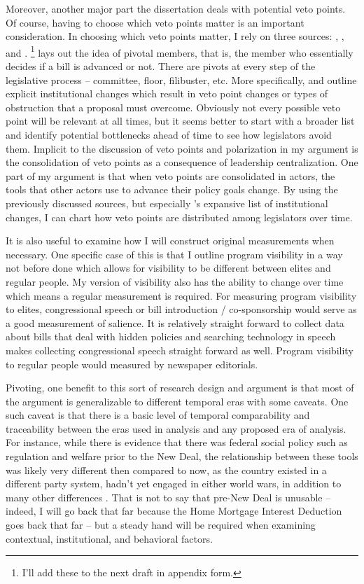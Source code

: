 \documentclass[12pt]{article}
\begin{document}
Moreover, another major part the dissertation deals with potential veto points. Of course, having to choose which veto points matter is an important consideration. In choosing which veto points matter, I rely on three sources: \cite{krehbiel1998}, \cite{schickler2001}, and \cite{koger2010}. \footnote{I'll add these to the next draft in appendix form.} \cite{krehbiel1998} lays out the idea of pivotal members, that is, the member who essentially decides if a bill is advanced or not. There are pivots at every step of the legislative process -- committee, floor, filibuster, etc. More specifically, \cite{schickler2001} and \cite{koger2010} outline explicit institutional changes which result in veto point changes or types of obstruction that a proposal must overcome. Obviously not every possible veto point will be relevant at all times, but it seems better to start with a broader list and identify potential bottlenecks ahead of time to see how legislators avoid them. Implicit to the discussion of veto points and polarization in my argument is the consolidation of veto points as a consequence of leadership centralization. One part of my argument is that when veto points are consolidated in actors, the tools that other actors use to advance their policy goals change. By using the previously discussed sources, but especially \cite{schickler2001}'s expansive list of institutional changes, I can chart how veto points are distributed among legislators over time.

It is also useful to examine how I will construct original measurements when necessary. One specific case of this is that I outline program visibility in a way not before done which allows for visibility to be different between elites and regular people. My version of visibility also has the ability to change over time which means a regular measurement is required. For measuring program visibility to elites, congressional speech or bill introduction / co-sponsorship would serve as a good measurement of salience. It is relatively straight forward to collect data about bills that deal with hidden policies and searching technology in speech makes collecting congressional speech straight forward as well. Program visibility to regular people would measured by newspaper editorials.

Pivoting, one benefit to this sort of research design and argument is that most of the argument is generalizable to different temporal eras with some caveats. One such caveat is that there is a basic level of temporal comparability and traceability between the eras used in analysis and any proposed era of analysis. For instance, while there is evidence that there was federal social policy such as regulation and welfare prior to the New Deal, the relationship between these tools was likely very different then compared to now, as the country existed in a different party system, hadn't yet engaged in either world wars, in addition to many other differences \citep{skocpol1995, balogh2009}. That is not to say that pre-New Deal is unusable -- indeed, I will go back that far because the Home Mortgage Interest Deduction goes back that far -- but a steady hand will be required when examining contextual, institutional, and behavioral factors.
\end{document}
